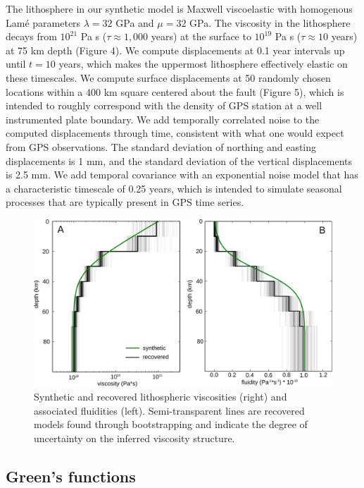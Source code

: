 \documentclass[extra]{gji}
\begin{document}
The lithosphere in our synthetic model is Maxwell viscoelastic with
homogenous Lam\'e parameters $\lambda = 32$ GPa and $\mu = 32$
GPa.  The viscosity in the lithosphere decays from $10^{21}$ Pa s
($\tau\approx1,000$ years) at the surface to $10^{19}$ Pa s
($\tau\approx10$ years) at 75 km depth (Figure 4).  We compute
displacements at 0.1 year intervals up until $t=10$ years, which makes
the uppermost lithosphere effectively elastic on these timescales. We compute
surface displacements at 50 randomly chosen locations within a 400 km
square centered about the fault (Figure 5), which is intended to
roughly correspond with the density of GPS station at a well
instrumented plate boundary.  We add temporally correlated noise to
the computed displacements through time, consistent with what one would
expect from GPS observations.  The standard deviation of northing and
easting displacements is 1 mm, and the standard deviation of the
vertical displacements is 2.5 mm.  We add temporal covariance with an
exponential noise model that has a characteristic timescale of 0.25
years, which is intended to simulate seasonal processes that are
typically present in GPS time series.

\begin{figure}\label{figure4}
  \centering
  \includegraphics[scale=0.7]{FinalFigures/Figure3.pdf}
  \caption{Synthetic and recovered lithospheric viscosities (right)
    and associated fluidities (left).  Semi-transparent lines are recovered
    models found through bootstrapping and indicate the degree of
    uncertainty on the inferred viscosity structure.}
  \label{Figure 4}
\end{figure}

\subsection{Green's functions}
\end{document}
